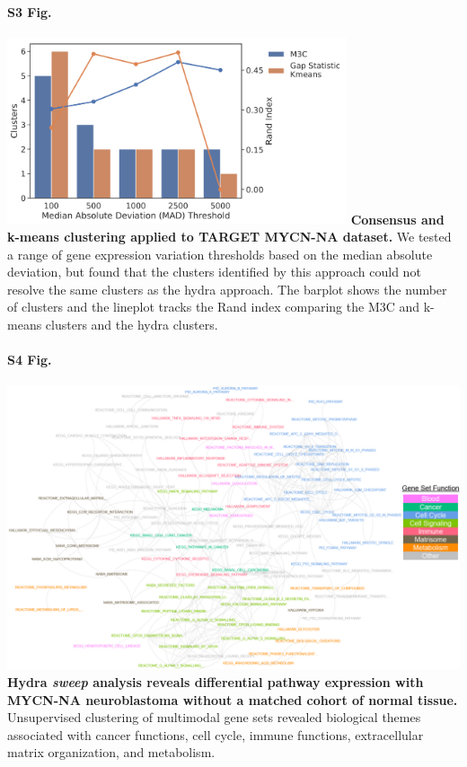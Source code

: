 \documentclass[10pt,letterpaper]{article}
\begin{document}
\paragraph*{S3 Fig.}
\includegraphics[width=0.75\textwidth]{img/PNG/clustering-screen}
\label{S3_Fig}
{\bf{Consensus and k-means clustering applied to TARGET MYCN-NA dataset.}} We tested a range of gene expression variation thresholds based on the median absolute deviation, but found that the clusters identified by this approach could not resolve the same clusters as the hydra approach. The barplot shows the number of clusters and the lineplot tracks the Rand index comparing the M3C and k-means clusters and the hydra clusters.

\paragraph*{S4 Fig.}
\includegraphics[width=\textwidth]{img/PNG/sweep-gene-set-network-V4-2x}
\label{S4_Fig}{\bf Hydra \textit{sweep} analysis reveals differential pathway expression with MYCN-NA neuroblastoma without a matched cohort of normal tissue.}
Unsupervised clustering of multimodal gene sets revealed biological themes associated with cancer functions, cell cycle, immune functions, extracellular matrix organization, and metabolism.
\end{document}
